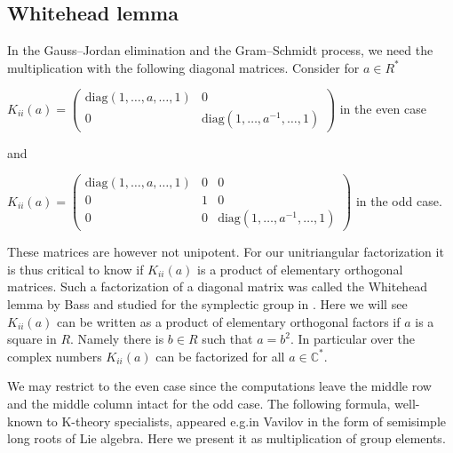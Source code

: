 \documentclass[11pt]{amsart}
\theoremstyle{definition}
\theoremstyle{remark}
\theoremstyle{remark}
\newcommand{\C}{\mathbb{C}}
\begin{document}
\subsection{Whitehead lemma}\label{subsect-Whitehead}
In the Gauss--Jordan elimination and the Gram--Schmidt process, we need the multiplication with the following diagonal matrices. Consider for $a \in R^*$ 
\begin{center}
$    K_{ii}(a)=\begin{pmatrix}
                    \mathrm{diag}(1,\dots,a,\dots,1) & 0\\
                    0 & \mathrm{diag}(1,\dots,a^{-1},\dots,1)
                \end{pmatrix} $  in the even case 
\end{center}
and 
\begin{center}
  $  K_{ii}(a)=
\begin{pmatrix}
\mathrm{diag}(1,\dots,a,\dots,1) & 0 & 0\\
0 & 1 & 0\\
0 & 0 & \mathrm{diag}(1,\dots,a^{-1},\dots,1)
\end{pmatrix}$  in the odd case.
\end{center}


These matrices are however not unipotent. For our unitriangular factorization it is thus critical to know if $K_{ii}(a)$ is a product of elementary orthogonal matrices.  Such a factorization of a diagonal matrix was called the Whitehead lemma by Bass \cite{MR0249491} and studied for the symplectic group in \cite{MR4078081}. Here we will see $K_{ii}(a)$ can be written as a product of elementary orthogonal factors if $a$ is a square in $R$. Namely there is $b \in R$ such that $a = b^2$. In particular over the complex numbers $K_{ii}(a)$ can be factorized for all $a \in \C^*$. 

We may restrict to the even case since the computations leave the middle row and the middle column intact for the odd case. 
The following formula, well-known to K-theory specialists, appeared e.g.\@ in Vavilov \cite[Section 5]{05859446} in the form of semisimple long roots of Lie algebra. Here we present it as  multiplication of group elements. 

\end{document}
